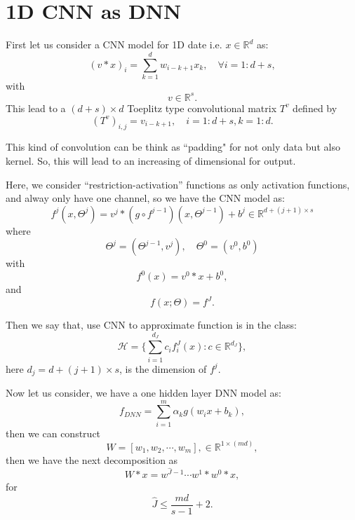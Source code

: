 \section{1D CNN as DNN}
First let us consider a CNN model for 1D date i.e. $x \in \mathbb{R}^d$ as:
$$
(v\ast x)_i = \sum_{k=1}^d w_{i-k+1}x_k, \quad \forall i = 1:d+s,
$$
with 
$$
v \in \mathbb{R}^s.
$$
This lead to a $(d+s)\times d$ Toeplitz type convolutional matrix $T^v$ defined by
$$
(T^v)_{i,j} = v_{i-k+1}, \quad i=1:d+s, k = 1:d.
$$

This kind of convolution can be think as ``padding" for not only data but also kernel.
So, this will lead to an increasing of dimensional for output.

Here, we consider ``restriction-activation'' functions as only activation functions,
and alway only have one channel, so we have the CNN model  as:
\begin{equation}\label{CNN_iteration_vector}
f^j(x,\Theta^j) = v^j \ast( g \circ f^{j-1})(x,\Theta^{j-1}) + b^j \in \mathbb{R}^{d + (j+1) \times s }
\end{equation}
where
\begin{equation}
\Theta^j=(\Theta^{j-1},v^j), \quad \Theta^0=(v^0, b^0) 
\end{equation}
with 
\begin{equation}
f^0(x)=v^0 \ast x + b^0,
\end{equation}
and 
\begin{equation}\label{CNN_finallayer}
f(x; \Theta) = f^J.
\end{equation}

Then we say that, use CNN to approximate function is in the class:
$$
\mathcal{H} = \{ \sum_{i= 1}^{d_J} c_i f^J_i(x): c \in \mathbb{R}^{d_J}\},
$$
here $d_j = d + (j+1)\times s$, is the dimension of $f^j$. 

Now let us consider, we have a one hidden layer DNN model as:
$$
f_{DNN} = \sum_{i=1}^m \alpha_k g( w_i x + b_k),
$$ 
then we can construct 
$$
W = [w_1, w_2, \cdots, w_m], \in \mathbb{R}^{1\times(md)},
$$
then we have the next decomposition as
$$
W\ast x = w^{\hat J-1} \cdots w^1\ast w^0 \ast x,
$$
for 
$$
\hat J \le \frac{md}{s-1} +2.
$$


